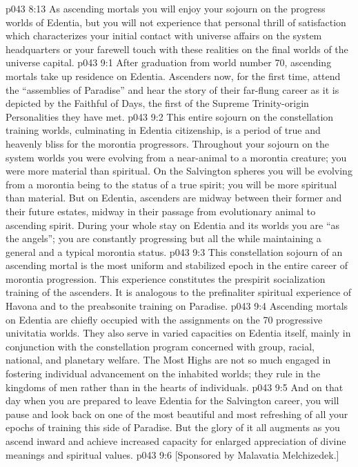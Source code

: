 \vs p043 8:13 As ascending mortals you will enjoy your sojourn on the progress worlds of Edentia, but you will not experience that personal thrill of satisfaction which characterizes your initial contact with universe affairs on the system headquarters or your farewell touch with these realities on the final worlds of the universe capital.
\vs p043 9:1 After graduation from world number 70, ascending mortals take up residence on Edentia. Ascenders now, for the first time, attend the “assemblies of Paradise” and hear the story of their far\hyp{}flung career as it is depicted by the Faithful of Days, the first of the Supreme Trinity\hyp{}origin Personalities they have met.
\vs p043 9:2 \pc This entire sojourn on the constellation training worlds, culminating in Edentia citizenship, is a period of true and heavenly bliss for the morontia progressors. Throughout your sojourn on the system worlds you were evolving from a near\hyp{}animal to a morontia creature; you were more material than spiritual. On the Salvington spheres you will be evolving from a morontia being to the status of a true spirit; you will be more spiritual than material. But on Edentia, ascenders are midway between their former and their future estates, midway in their passage from evolutionary animal to ascending spirit. During your whole stay on Edentia and its worlds you are “as the angels”; you are constantly progressing but all the while maintaining a general and a typical morontia status.
\vs p043 9:3 This constellation sojourn of an ascending mortal is the most uniform and stabilized epoch in the entire career of morontia progression. This experience constitutes the prespirit socialization training of the ascenders. It is analogous to the prefinaliter spiritual experience of Havona and to the preabsonite training on Paradise.
\vs p043 9:4 \pc Ascending mortals on Edentia are chiefly occupied with the assignments on the 70 progressive univitatia worlds. They also serve in varied capacities on Edentia itself, mainly in conjunction with the constellation program concerned with group, racial, national, and planetary welfare. The Most Highs are not so much engaged in fostering individual advancement on the inhabited worlds; they rule in the kingdoms of men rather than in the hearts of individuals.
\vs p043 9:5 And on that day when you are prepared to leave Edentia for the Salvington career, you will pause and look back on one of the most beautiful and most refreshing of all your epochs of training this side of Paradise. But the glory of it all augments as you ascend inward and achieve increased capacity for enlarged appreciation of divine meanings and spiritual values.
\vsetoff
\vs p043 9:6 [Sponsored by Malavatia Melchizedek.]
\quizlink
